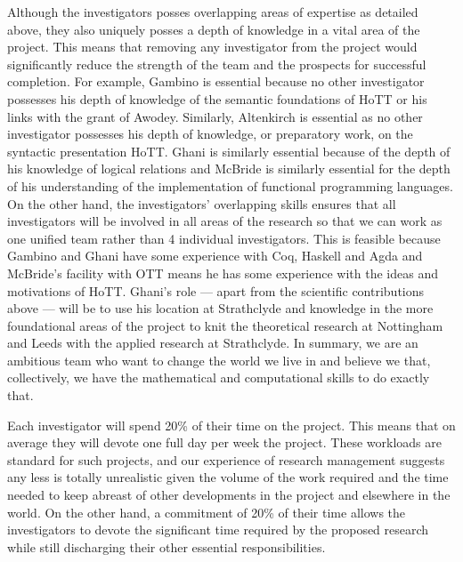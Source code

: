 \documentclass[a4paper,11pt]{article}
\begin{document}
\noindent Although the investigators posses overlapping areas of expertise as
detailed above, they also uniquely posses a depth of knowledge
in a vital area of the project. This means that removing any
investigator from the project would significantly reduce the strength
of the team and the prospects for successful completion. For example,
Gambino is essential because no other investigator possesses his depth
of knowledge of the semantic foundations of HoTT or his links with the
grant of Awodey. Similarly, Altenkirch is essential as no other
investigator possesses his depth of knowledge, or preparatory work, on
the syntactic presentation HoTT. Ghani is similarly essential because
of the depth of his knowledge of logical relations and McBride is
similarly essential for the depth of his understanding of the
implementation of functional programming languages. On the other hand,
the investigators' overlapping skills ensures that all investigators
will be involved in all areas of the research so that we can work
as one unified team rather than 4 individual investigators. This is
feasible because Gambino and Ghani have some experience with
Coq, Haskell and Agda and McBride's facility with OTT means he has some experience with
the ideas and motivations of HoTT. Ghani's role --- apart from the
scientific contributions above --- will be to use his location at
Strathclyde and knowledge in the more foundational areas of the
project to knit the theoretical research at Nottingham and Leeds with
the applied research at Strathclyde. In summary, we are an ambitious
team who want to change the world we live in and believe we that,
collectively, we have the mathematical and computational skills to do
exactly that.

\vspace{0.02in}

Each investigator will spend 20\% of their time on the project.  This
means that on average they will devote one full day per week the
project. These workloads are standard for such projects, and our
experience of research management suggests any less is totally
unrealistic given the volume of the work required and the time needed
to keep abreast of other developments in the project and elsewhere in
the world.  On the other hand, a commitment of 20\% of their time
allows the investigators to devote the significant time required by
the proposed research while still discharging their other essential
responsibilities.

\vspace{0.02in}
\end{document}
